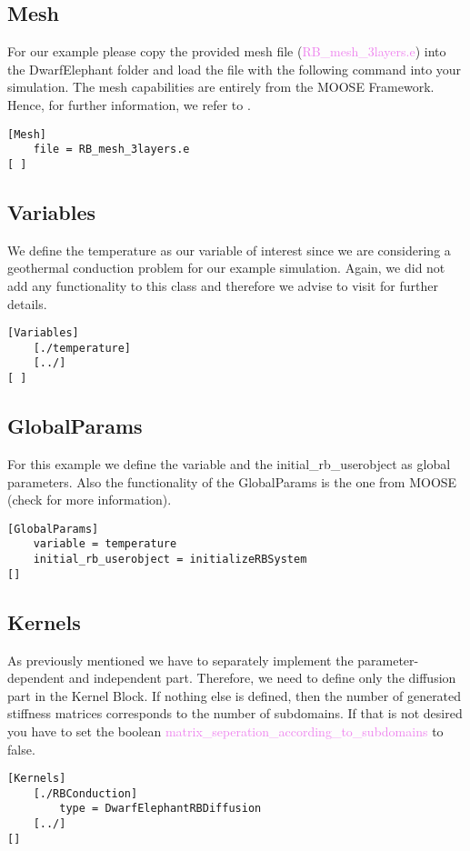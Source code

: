 \documentclass[11pt, a4paper, DIV=14]{scrartcl}
\begin{document}
\subsection{Mesh}
For our example please copy the provided mesh file (\textcolor{violet}{RB\_mesh\_3layers.e}) into the DwarfElephant folder and load the file with the following command into your simulation. The mesh capabilities are entirely from the MOOSE Framework. Hence, for further information, we refer to \cite{moose-web-page}.
\begin{lstlisting}
[Mesh] 
    file = RB_mesh_3layers.e
[ ]
\end{lstlisting}

\subsection{Variables}
We define the temperature as our variable of interest since we are considering a geothermal conduction problem for our example simulation. Again, we did not add any functionality to this class and therefore we advise to visit \cite{moose-web-page} for further details.
\begin{lstlisting}
[Variables]
    [./temperature]
    [../]
[ ]
\end{lstlisting}

\subsection{GlobalParams}
For this example we define the variable and the initial\_rb\_userobject as global parameters. Also the functionality of the GlobalParams is the one from MOOSE (check \cite{moose-web-page} for more information).
\begin{lstlisting}
[GlobalParams]
    variable = temperature
    initial_rb_userobject = initializeRBSystem
[]
\end{lstlisting}

\subsection{Kernels}
As previously mentioned we have to separately implement the parameter-dependent and independent part. Therefore, we need to define only the diffusion part in the Kernel Block. If nothing else is defined, then the number of generated stiffness matrices corresponds to the number of subdomains. If that is not desired you have to set the boolean \textcolor{violet}{matrix\_seperation\_according\_to\_subdomains} to false.
\begin{lstlisting}
[Kernels]
    [./RBConduction]
        type = DwarfElephantRBDiffusion
    [../]
[]
\end{lstlisting}
\end{document}
